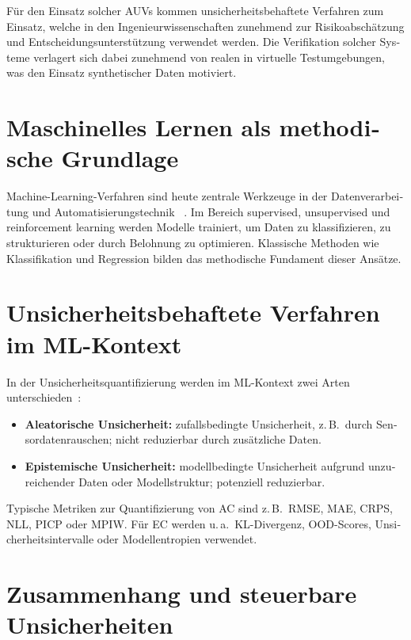 \begin{otherlanguage}{ngerman}
Für den Einsatz solcher AUVs kommen unsicherheitsbehaftete Verfahren zum Einsatz, welche in den Ingenieurwissenschaften zunehmend zur Risikoabschätzung und Entscheidungsunterstützung verwendet werden. Die Verifikation solcher Systeme verlagert sich dabei zunehmend von realen in virtuelle Testumgebungen, was den Einsatz synthetischer Daten motiviert.


\section{Maschinelles Lernen als methodische Grundlage}

Machine-Learning-Verfahren sind heute zentrale Werkzeuge in der Datenverarbeitung und Automatisierungstechnik ~\parencite{Nof2023}. Im Bereich supervised, unsupervised und reinforcement learning werden Modelle trainiert, um Daten zu klassifizieren, zu strukturieren oder durch Belohnung zu optimieren. Klassische Methoden wie Klassifikation und Regression bilden das methodische Fundament dieser Ansätze.

\section{Unsicherheitsbehaftete Verfahren im ML-Kontext}

In der Unsicherheitsquantifizierung werden im ML-Kontext zwei Arten unterschieden~\parencite{Hullermeier2021}:

\begin{itemize}
  \item \textbf{\gls{Aleatorische Unsicherheit}:} zufallsbedingte Unsicherheit, z.\,B.\ durch Sensordatenrauschen; nicht reduzierbar durch zusätzliche Daten.
  \item \textbf{\gls{Epistemische Unsicherheit}:} modellbedingte Unsicherheit aufgrund unzureichender Daten oder Modellstruktur; potenziell reduzierbar.
\end{itemize}

\noindent
Typische Metriken zur Quantifizierung von AC sind z.\,B.\ RMSE, MAE, CRPS, NLL, PICP oder MPIW. Für EC werden u.\,a.\ KL-Divergenz, OOD-Scores, Unsicherheitsintervalle oder Modellentropien verwendet.

\section{Zusammenhang und steuerbare Unsicherheiten}


\end{otherlanguage}
